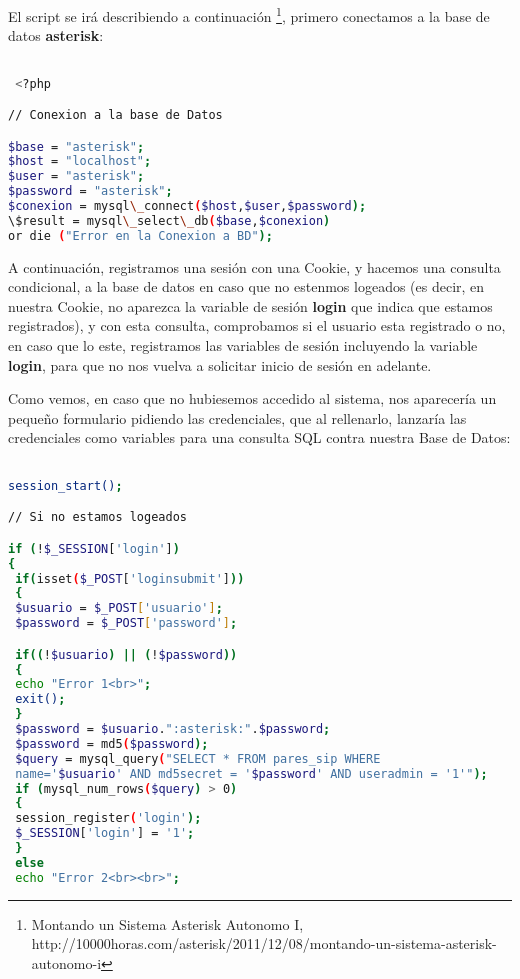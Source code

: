 {El script se irá describiendo a continuación \footnote{Montando un Sistema Asterisk Autonomo I, \\ http://10000horas.com/asterisk/2011/12/08/montando-un-sistema-asterisk-autonomo-i}, primero conectamos a la base de datos \textbf{asterisk}:

\begin{lstlisting}[language=bash,title={./www/usuarios.php}]

 <?php

// Conexion a la base de Datos

$base = "asterisk";
$host = "localhost";
$user = "asterisk";
$password = "asterisk";
$conexion = mysql\_connect($host,$user,$password);
\$result = mysql\_select\_db($base,$conexion) 
or die ("Error en la Conexion a BD");

\end{lstlisting}

A continuación, registramos una sesión con una Cookie, y hacemos una consulta condicional, a la base de datos en caso que no estenmos logeados (es decir, en nuestra Cookie, no aparezca la variable de sesión \textbf{login} que indica que estamos registrados), y con esta consulta, comprobamos si el usuario esta registrado o no, en caso que lo este, registramos las variables de sesión incluyendo la variable \textbf{login}, para que no nos vuelva a solicitar inicio de sesión en adelante.

Como vemos, en caso que no hubiesemos accedido al sistema, nos aparecería un pequeño formulario pidiendo las credenciales, que al rellenarlo, lanzaría las credenciales como variables para una consulta SQL contra nuestra Base de Datos:

\begin{lstlisting}[language=bash,title={./www/usuarios.php}]

session_start();

// Si no estamos logeados

if (!$_SESSION['login'])
{
 if(isset($_POST['loginsubmit']))
 {
 $usuario = $_POST['usuario'];
 $password = $_POST['password'];

 if((!$usuario) || (!$password))
 {
 echo "Error 1<br>";
 exit();
 }
 $password = $usuario.":asterisk:".$password;
 $password = md5($password);
 $query = mysql_query("SELECT * FROM pares_sip WHERE 
 name='$usuario' AND md5secret = '$password' AND useradmin = '1'");
 if (mysql_num_rows($query) > 0)
 {
 session_register('login');
 $_SESSION['login'] = '1';
 }
 else
 echo "Error 2<br><br>";


\end{lstlisting}}

